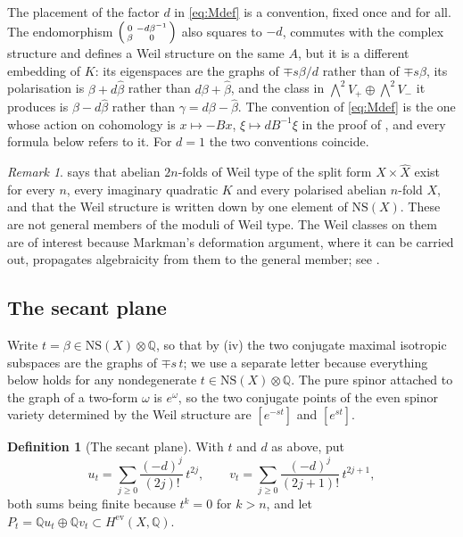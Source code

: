 \documentclass[11pt,reqno]{amsart}
\theoremstyle{plain}
\theoremstyle{definition}
\newtheorem{definition}[theorem]{Definition}
\theoremstyle{remark}
\newtheorem{remark}[theorem]{Remark}
\newcommand{\QQ}{\mathbb{Q}}
\newcommand{\NS}{\mathrm{NS}}
\begin{document}
The placement of the factor $d$ in \eqref{eq:Mdef} is a convention, fixed once
and for all. The endomorphism $\begin{psmallmatrix}0&-d\beta^{-1}\\
\beta&0\end{psmallmatrix}$ also squares to $-d$, commutes with the complex
structure and defines a Weil structure on the same $A$, but it is a different
embedding of $K$: its eigenspaces are the graphs of $\mp s\beta/d$ rather
than of $\mp s\beta$, its polarisation is $\beta+d\widehat\beta$ rather than
$d\beta+\widehat\beta$, and the class in
$\bigwedge^{2}V_{+}\oplus\bigwedge^{2}V_{-}$ it produces is
$\beta-d\widehat\beta$ rather than $\gamma=d\beta-\widehat\beta$. The
convention of \eqref{eq:Mdef} is the one whose action on cohomology is
$x\mapsto-Bx$, $\xi\mapsto dB^{-1}\xi$ in the proof of
, and every formula below refers to it. For $d=1$ the
two conventions coincide.

\begin{remark}\label{rem:abundant}
 says that abelian $2n$-folds of Weil type of the split
form $X\times\widehat{X}$ exist for every $n$, every imaginary quadratic $K$
and every polarised abelian $n$-fold $X$, and that the Weil structure is
written down by one element of $\NS(X)$. These are not general members of the
moduli of Weil type. The Weil classes on them are of interest because
Markman's deformation argument, where it can be carried out, propagates
algebraicity from them to the general member; see .
\end{remark}

\subsection{The secant plane}

Write $t=\beta\in\NS(X)\otimes\QQ$, so that by
(iv) the two conjugate maximal isotropic subspaces are
the graphs of $\mp s\,t$; we use a separate letter because everything below
holds for any nondegenerate $t\in\NS(X)\otimes\QQ$. The pure spinor
attached to the graph of a two-form $\omega$ is $e^{\omega}$, so the two
conjugate points of the even spinor variety determined by the Weil structure
are $[e^{-st}]$ and $[e^{st}]$.

\begin{definition}[The secant plane]\label{def:secantplane}
With $t$ and $d$ as above, put
\begin{equation}\label{eq:uv}
  u_{t}=\sum_{j\ge0}\frac{(-d)^{j}}{(2j)!}\,t^{2j},
  \qquad
  v_{t}=\sum_{j\ge0}\frac{(-d)^{j}}{(2j+1)!}\,t^{2j+1},
\end{equation}
both sums being finite because $t^{k}=0$ for $k>n$, and let
$P_{t}=\QQ u_{t}\oplus\QQ v_{t}\subset H^{\mathrm{ev}}(X,\QQ)$.
\end{definition}
\end{document}

